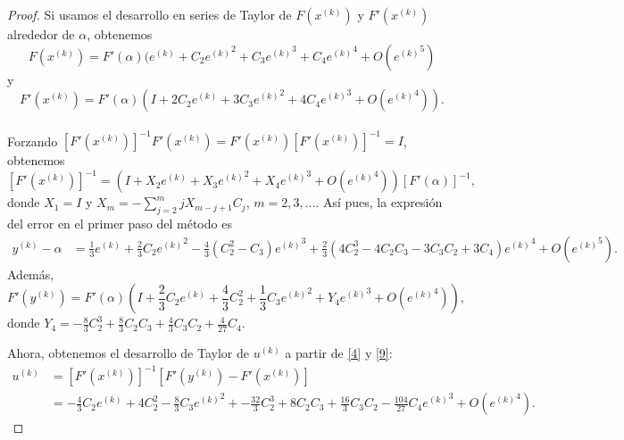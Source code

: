 \begin{proof}
	Si usamos el desarrollo en series de Taylor de $F\left(x^{(k)}\right)$ y $F'\left(x^{(k)}\right)$ alrededor de $\alpha$, obtenemos
	\begin{equation*}%
	F({x^{(k)}}) = {F'}(\alpha )({e^{(k)}} + {C_2}{e^{(k)}}^2 +
	{C_3}{e^{(k)}}^3 + {C_4}{e^{(k)}}^4  + O({e^{(k)}}^5)
	\end{equation*}
	y
	\begin{equation}\label{4}
	{F'}({x^{(k)}}) = {F'}(\alpha )(I + 2{C_2}{e^{(k)}} +
	3{C_3}{e^{(k)}}^2 + 4{C_4}{e^{(k)}}^3  + O({e^{(k)}}^4)).
	\end{equation}\\
	Forzando $[{F'}({x^{(k)}})]^{ -
		1}{F'}({x^{(k)}})={F'}({x^{(k)}})[{F'}({x^{(k)}})]^{ - 1}=I$, obtenemos
	\begin{equation*}%
	{[{F'}({x^{(k)}})]^{ - 1}} = (I + {X_2}{e^{(k)}} + {X_3}{e^{(k)}}^2
	+ {X_4}{e^{(k)}}^3  + O({e^{(k)}}^4) ){[{F'}(\alpha )]^{ - 1}},
	\end{equation*}
	donde $X_1=I$ y ${X_m} = -\sum_{j=2}^{m}{j X_{m-j+1}C_j}$,
	$m=2,3,\ldots$. Así pues, la expresión del error en el primer paso del método es
	\begin{equation*}%
	\begin{split}
	{y^{(k)}} - \alpha &= \frac{1}{3}{e^{(k)}} +
	\frac{2}{3}{C_2}{e^{(k)}}^2 - \frac{4}{3}(C_2^2 - {C_3}){e^{(k)}}^3
	+ \frac{2}{3}(4C_2^3 - 4{C_2}{C_3} - 3{C_3}{C_2} +
	3{C_4}){e^{(k)}}^4 + O({e^{(k)}}^5).
	\end{split}
	\end{equation*}
	Además,
	\begin{equation}\label{9}
	{F'}({y^{(k)}}) = {F'}(\alpha )\left( I + \frac{2}{3}{C_2}{e^{(k)}}
	+\frac{4}{3}C_2^2 + \frac{1}{3}{C_3}{e^{(k)}}^2 + {Y_4}{e^{(k)}}^3
	+ O({e^{(k)}}^4) \right),
	\end{equation}
	donde ${Y_4} =  - \frac{8}{3}C_2^3 + \frac{8}{3}{C_2}{C_3} +
	\frac{4}{3}{C_3}{C_2} + \frac{4}{{27}}{C_4}$.
	
	
	Ahora, obtenemos el desarrollo de Taylor de ${u^{(k)}}$ a partir de \eqref{4} y	\eqref{9}:
	\begin{equation*}%
	\begin{split}
	{u^{(k)}}
	&= {[{F'}({x^{(k)}})]^{ - 1}}[{F'}({y^{(k)}}) - {F'}({x^{(k)}})]\\
	&=- \frac{4}{3}{C_2}{e^{(k)}} + 4C_2^2 - \frac{8}{3}{C_3}{e^{(k)}}^2
	+ - \frac{{32}}{3}C_2^3 + 8{C_2}{C_3}+ \frac{{16}}{3}{C_3}{C_2} -
	\frac{{104}}{{27}}{C_4}{e^{(k)}}^3  + O({e^{(k)}}^4).
	\end{split}
	\end{equation*}
	

\end{proof}
